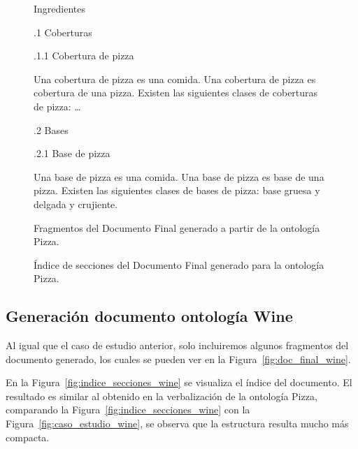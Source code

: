 \begin{figure}
{\begin{minipage}{14cm}
\large{
 Ingredientes
	
.1 Coberturas
	
.1.1 Cobertura de pizza
}

\small{
Una cobertura de pizza es una comida. Una cobertura de pizza es cobertura de una pizza. Existen las siguientes clases de coberturas de pizza: \dots
}

\large{
.2 Bases
}

\large{
.2.1 Base de pizza
}

\small{
Una base de pizza es una comida. Una base de pizza es base de una pizza. Existen las siguientes clases de bases de pizza: base gruesa y delgada y crujiente.
}
\end{minipage}
}
\caption{Fragmentos del Documento Final generado a partir de la ontología Pizza.}
\label{fig:doc_final_pizza}
\end{figure}

\begin{figure}
\begin{multicols}{2}
\small{
\begin{figure}[H]
\end{figure}

\begin{figure}[H]
\end{figure}
}
\end{multicols}
\caption{Índice de secciones del Documento Final generado para la ontología Pizza.}
\label{fig:indice_secciones_pizza}
\end{figure}


\subsection{Generación documento ontología Wine}
Al igual que el caso de estudio anterior, solo incluiremos algunos fragmentos del documento generado, los cuales se pueden ver en la Figura~\ref{fig:doc_final_wine}.

En la Figura~\ref{fig:indice_secciones_wine} se visualiza el índice del documento. El resultado es similar al obtenido en la verbalización de la ontología Pizza, comparando la Figura~\ref{fig:indice_secciones_wine} con la Figura~\ref{fig:caso_estudio_wine}, se observa que la estructura resulta mucho más compacta.

